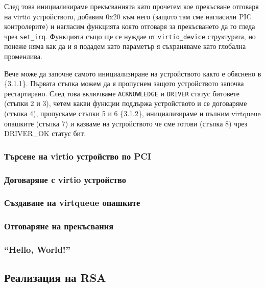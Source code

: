 След това инициализираме прекъсванията като прочетем кое прекъсване отговаря на virtio устройството, добавим 0x20 към него (защото там сме нагласили PIC контролерите) и нагласим функцията която отговаря за прекъсването да го гледа чрез {\tt set\_irq}. Функцията също ще се нуждае от {\tt virtio\_device} структурата, но понеже няма как да и я подадем като параметър я съхраняваме като глобална променлива.

Вече може да започне самото инициализиране на устройството както е обяснено в \{3.1.1\}. Първата стъпка можем да я пропуснем защото устройството започва рестартирано. След това включваме {\tt ACKNOWLEDGE} и {\tt DRIVER} статус битовете (стъпки 2 и 3), четем какви функции поддържа устройството и се договаряме (стъпка 4), пропускаме стъпки 5 и 6 \{3.1.2\}, инициализираме и пълним virtqueue опашките (стъпка 7) и казваме на устройството че сме готови (стъпка 8) чрез DRIVER_OK статус бит.

\subsubsection{Търсене на virtio устройство по PCI}

\subsubsection{Договаряне с virtio устройство}

\subsubsection{Създаване на virtqueue опашките}

\subsubsection{Отговаряне на прекъсвания}

\subsubsection{``Hello, World!''}

\subsection{Реализация на RSA}

